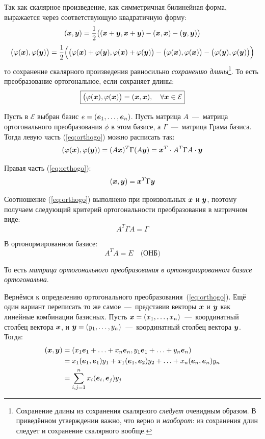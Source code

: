 \documentclass[a4paper,12pt]{article}
\theoremstyle{remark}
\begin{document}
  Так как скалярное произведение, как симметричная билинейная форма, выражается через соответствующую квадратичную форму:
  \[
    (\boldsymbol x, \boldsymbol y) = \frac{1}{2} \bigl((\boldsymbol x + \boldsymbol y, \boldsymbol x + \boldsymbol y) - (\boldsymbol x, \boldsymbol x) - (\boldsymbol y, \boldsymbol y)\bigr)
  \]
  \[
    \bigl(\varphi(\boldsymbol x), \varphi(\boldsymbol y)\bigr) = \frac{1}{2} \Bigl(\bigl(\varphi(\boldsymbol x) + \varphi(\boldsymbol y), \varphi(\boldsymbol x) + \varphi(\boldsymbol y)\bigr) - \bigl(\varphi(\boldsymbol x), \varphi(\boldsymbol x)\bigr) - \bigl(\varphi(\boldsymbol y), \varphi(\boldsymbol y)\bigr)\Bigr)
  \]
  то сохранение скалярного произведения равносильно \emph{сохранению длины}\footnote{Сохранение длины из сохранения скалярного \emph{следует} очевидным образом. В приведённом утверждении важно, что верно и \emph{наоборот}: из сохранения длин следует и сохранение скалярного вообще.}.
  То есть преобразование ортогональное, если сохраняет длины:
  \[
    \boxed{\bigl(\varphi(\boldsymbol x), \varphi(\boldsymbol x)\bigr) = (\boldsymbol x, \boldsymbol x),\quad \forall \boldsymbol x \in \mathcal E}
  \]
  
  Пусть в $\mathcal E$ выбран базис $e \hm= (\bds e_1, \ldots, \bds e_n)$.
  Пусть матрица $A$~---~матрица ортогонального преобразования $\phi$ в этом базисе, а $\Gamma$~---~матрица Грама базиса.
  Тогда левую часть (\ref{eq:orthogo}) можно расписать так:
  \[
    (\varphi(\boldsymbol x), \varphi(\boldsymbol y)) = (A \boldsymbol x)^T \Gamma (A \boldsymbol y) = \boldsymbol x^T \cdot A^T \Gamma A \cdot \boldsymbol y
  \]
  
  Правая часть (\ref{eq:orthogo}):
  \[
    (\boldsymbol x, \boldsymbol y) = \boldsymbol x^T \Gamma \boldsymbol y
  \]
  
  Соотношение (\ref{eq:orthogo}) выполнено при произвольных $\boldsymbol x$ и $\boldsymbol y$, поэтому получаем следующий критерий ортогональности преобразования в матричном виде:
  \[
    \boxed{A^T \Gamma A = \Gamma}
  \]
  
  В ортонормированном базисе:
  \begin{equation}\label{eq:orthogo-matrix-in-onb}
    A^T A = E\quad \mbox{(ОНБ)}
  \end{equation}
  
  То есть \emph{матрица ортогонального преобразования в ортонормированном базисе ортогональна}.
  
  \medskip
  
  Вернёмся к определению ортогонального преобразования~(\ref{eq:orthogo}).
  Ещё один вариант переписать то же самое~---~представив векторы $\boldsymbol x$ и $\boldsymbol y$ как линейные комбинации базисных.
  Пусть $\bds x \hm= (x_1, \ldots, x_n)$~---~координатный столбец вектора $\boldsymbol x$, и $\bds y \hm= (y_1, \ldots, y_n)$~---~координатный столбец вектора $\boldsymbol y$.
  Тогда:
  \begin{equation*}
  \begin{split}
    (\boldsymbol x, \boldsymbol y)
    &= (x_1 \boldsymbol e_1 + \ldots + x_n \boldsymbol e_n,
        y_1 \boldsymbol e_1 + \ldots + y_n \boldsymbol e_n)\\
    &= x_1 (\boldsymbol e_1, \boldsymbol e_1) y_1 + x_1 (\boldsymbol e_1, \boldsymbol e_2) y_2 + \ldots + x_n (\boldsymbol e_n, \boldsymbol e_n) y_n\\
    &= \sum_{i, j = 1}^n x_i (\boldsymbol e_i, \boldsymbol e_j) y_j
  \end{split}
  \end{equation*}
  
\end{document}

